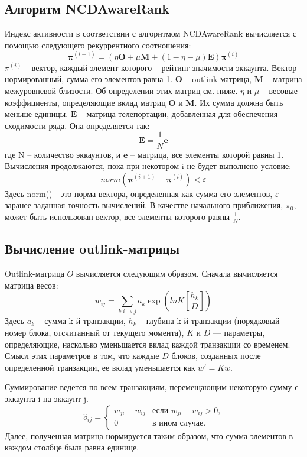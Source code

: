 \documentclass[a4paper,12pt]{article}
\begin{document}
\subsection{Алгоритм NCDAwareRank}
Индекс активности в соответствии с алгоритмом NCDAwareRank вычисляется с помощью следующего рекуррентного соотношения:
$$
\boldsymbol{\pi}^{(i+1)} = ( \eta \boldsymbol{O} + \mu \boldsymbol{M} + ( 1 - \eta - \mu ) \boldsymbol{E} ) \boldsymbol{\pi}^{(i)}
$$
$\pi^{(i)}$ -- вектор, каждый элемент которого -- рейтинг значимости эккаунта. Вектор нормированный, сумма его элементов равна 1.
$\boldsymbol{O}$ -- outlink-матрица, $\boldsymbol{M}$ – матрица межуровневой близости. Об определении этих матриц см. ниже.
$\eta$ и $\mu$ – весовые коэффициенты, определяющие вклад матриц $\boldsymbol{O}$ и $\boldsymbol{M}$. Их сумма должна быть меньше единицы.
$\boldsymbol{E}$ -- матрица телепортации, добавленная для обеспечения сходимости ряда. Она определяется так:
$$
\boldsymbol{E}=\frac{1}{N}\boldsymbol{e}
$$
где N -- количество эккаунтов, и $\boldsymbol{e}$ -- матрица, все элементы которой равны 1.
Вычисления продолжаются, пока при некотором i не будет выполнено условие:
$$
norm(\boldsymbol{\pi}^{(i+1)}-\boldsymbol{\pi}^{(i)})<\varepsilon
$$
Здесь norm() - это норма вектора, определенная как сумма его элементов, $\varepsilon$ — заранее заданная точность вычислений. 
В качестве начального приближения, $\pi_0$, может быть использован вектор, все элементы которого равны $\frac{1}{N}$.

\subsection{Вычисление outlink-матрицы}
Outlink-матрица $O$ вычисляется следующим образом. Сначала вычисляется матрица весов:
$$
w_{ij}=\sum_{k|i \to j}a_k \exp{(lnK [\frac{h_k}{D}])}
$$
Здесь $a_k$ – сумма k-й транзакции, $h_k$ – глубина  k-й транзакции (порядковый номер блока, отсчитанный от текущего момента), $K$ и  $D$ — параметры, определяющие, насколько уменьшается вклад каждой транзакции со временем. Смысл этих параметров в том, что каждые $D$ блоков, созданных после определенной транзакции, ее вклад уменьшается как $w'=Kw$.

Суммирование ведется по всем транзакциям, перемещающим некоторую сумму с эккаунта i на эккаунт j.
$$
\hat{o}_{ij} = \begin{cases}
 w_{ji}-w_{ij}
 & \text{если $w_{ji}-w_{ij} > 0$,}\\
 0 & \text{в ином случае.}
\end{cases}
$$
Далее, полученная матрица нормируется таким образом, что сумма элементов в каждом столбце была равна единице. 
\end{document}
